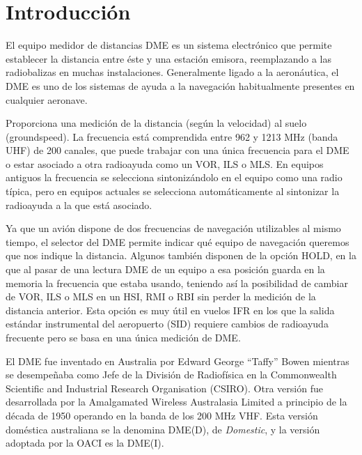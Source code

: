 
\section{Introducci\'on}
\label{sec:DME.introduccion}

El equipo medidor de distancias %
\ac{DME}
 es un sistema electr\'onico que permite establecer la distancia entre \'este y una estaci\'on emisora, reemplazando a las radiobalizas en muchas instalaciones. Generalmente ligado a la aeron\'autica, el DME es uno de los sistemas de ayuda a la navegaci\'on habitualmente presentes en cualquier aeronave.

Proporciona una medici\'on de la distancia (seg\'un la velocidad) al suelo (groundspeed). La frecuencia est\'a comprendida entre 962 y 1213 MHz (banda UHF) de 200 canales, que puede trabajar con una \'unica frecuencia para el DME o estar asociado a otra radioayuda como un VOR, ILS o MLS. En equipos antiguos la frecuencia se selecciona sintoniz\'andolo en el equipo como una radio t\'ipica, pero en equipos actuales se selecciona autom\'aticamente al sintonizar la radioayuda a la que est\'a asociado.

Ya que un avi\'on dispone de dos frecuencias de navegaci\'on utilizables al mismo tiempo, el selector del DME permite indicar qu\'e equipo de navegaci\'on queremos que nos indique la distancia. Algunos tambi\'en disponen de la opci\'on HOLD, en la que al pasar de una lectura DME de un equipo a esa posici\'on guarda en la memoria la frecuencia que estaba usando, teniendo as\'i la posibilidad de cambiar de VOR, ILS o MLS en un HSI, RMI o RBI sin perder la medici\'on de la distancia anterior. Esta opci\'on es muy \'util en vuelos IFR en los que la salida est\'andar instrumental del aeropuerto (SID) requiere cambios de radioayuda frecuente pero se basa en una \'unica medici\'on de DME.

El \ac{DME} fue inventado en Australia por  Edward George ``Taffy'' Bowen mientras se desempe\~naba como Jefe de la Divisi\'on de Radiof\'isica en la  Commonwealth Scientific and Industrial Research Organisation (CSIRO). Otra versi\'on fue desarrollada por la Amalgamated Wireless Australasia Limited a principio de la d\'ecada de 1950 operando en la banda de los 200 MHz VHF. Esta versi\'on dom\'estica australiana se la denomina DME(D), de \emph{Domestic}, y la versi\'on adoptada por la OACI es la DME(I).

